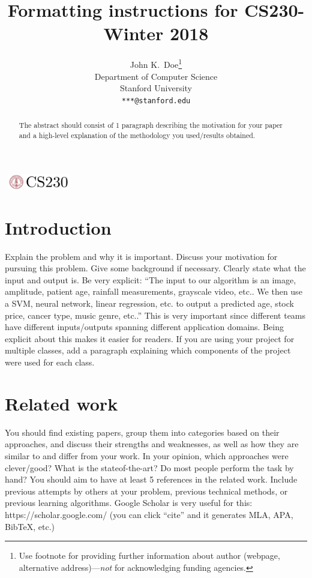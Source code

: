 \documentclass{article}
\title{Formatting instructions for CS230-Winter 2018}
\author{
  John K.~Doe\thanks{Use footnote for providing further
    information about author (webpage, alternative
    address)---\emph{not} for acknowledging funding agencies.} \\
  Department of Computer Science\\
  Stanford University\\
  \texttt{***@stanford.edu} \\
}
\begin{document}

\begin{center}
\includegraphics[width=3cm, height=0.7cm]{CS230}
\end{center}

\maketitle

\begin{abstract}
The abstract should consist of 1 paragraph describing the motivation for your paper and a high-level explanation of the methodology you used/results obtained.
\end{abstract}

\section{Introduction}	
Explain the problem and why it is important. Discuss your motivation for pursuing this
problem. Give some background if necessary. Clearly state what the input and output
is. Be very explicit: “The input to our algorithm is an {image, amplitude, patient age,
rainfall measurements, grayscale video, etc.}. We then use a {SVM, neural network, linear
regression, etc.} to output a predicted {age, stock price, cancer type, music genre, etc.}.”
This is very important since different teams have different inputs/outputs spanning different
application domains. Being explicit about this makes it easier for readers. If you are using
your project for multiple classes, add a paragraph explaining which components of the
project were used for each class.

\section{Related work}
You should find existing papers, group them into categories based on their approaches,
and discuss their strengths and weaknesses, as well as how they are similar to and differ
from your work. In your opinion, which approaches were clever/good? What is the stateof-the-art?
Do most people perform the task by hand? You should aim to have at least
5 references in the related work. Include previous attempts by others at your problem,
previous technical methods, or previous learning algorithms. Google Scholar is very useful
for this: https://scholar.google.com/ (you can click “cite” and it generates MLA, APA,
BibTeX, etc.)
\end{document}
